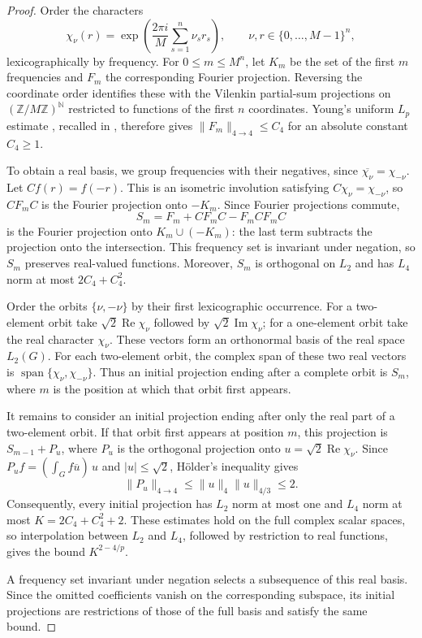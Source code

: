 \documentclass[11pt,a4paper,reqno]{amsart}
\theoremstyle{definition}
\newcommand{\N}{\mathbb N}
\newcommand{\norm}[1]{\lVert #1\rVert}
\numberwithin{equation}{section}
\begin{document}
\begin{proof}
Order the characters
\begin{equation*}
 \chi_\nu(r)=\exp\left(\frac{2\pi i}{M}
                  \sum_{s=1}^n\nu_sr_s\right),
 \qquad \nu,r\in\{0,\ldots,M-1\}^n,
\end{equation*}
lexicographically by frequency. For $0\leq m\leq M^n$, let $K_m$ be the set of the first $m$ frequencies and $F_m$ the corresponding Fourier projection. Reversing the coordinate order identifies these with the Vilenkin partial-sum projections on $(\mathbb Z/M\mathbb Z)^{\N}$ restricted to functions of the first $n$ coordinates. Young's uniform $L_p$ estimate \cite{Young1976}, recalled in \cite[(1.2)]{Young1991}, therefore gives $\norm{F_m}_{4\to4}\leq C_4$ for an absolute constant $C_4\geq1$.

To obtain a real basis, we group frequencies with their negatives, since $\overline{\chi_\nu}=\chi_{-\nu}$. Let $Cf(r)=f(-r)$. This is an isometric involution satisfying $C\chi_\nu=\chi_{-\nu}$, so $CF_mC$ is the Fourier projection onto $-K_m$. Since Fourier projections commute,
\begin{equation*}
 S_m=F_m+CF_mC-F_mCF_mC
\end{equation*}
is the Fourier projection onto $K_m\cup(-K_m)$: the last term subtracts the projection onto the intersection. This frequency set is invariant under negation, so $S_m$ preserves real-valued functions. Moreover, $S_m$ is orthogonal on $L_2$ and has $L_4$ norm at most $2C_4+C_4^2$.

Order the orbits $\{\nu,-\nu\}$ by their first lexicographic occurrence. For a two-element orbit take $\sqrt2\operatorname{Re}\chi_\nu$ followed by $\sqrt2\operatorname{Im}\chi_\nu$; for a one-element orbit take the real character $\chi_\nu$. These vectors form an orthonormal basis of the real space $L_2(G)$. For each two-element orbit, the complex span of these two real vectors is $\operatorname{span}\{\chi_\nu,\chi_{-\nu}\}$. Thus an initial projection ending after a complete orbit is $S_m$, where $m$ is the position at which that orbit first appears.

It remains to consider an initial projection ending after only the real part of a two-element orbit. If that orbit first appears at position $m$, this projection is $S_{m-1}+P_u$, where $P_u$ is the orthogonal projection onto $u=\sqrt2\operatorname{Re}\chi_\nu$. Since $P_uf=(\int_G f\overline u)\,u$ and $|u|\leq\sqrt2$, H\"older's inequality gives
\begin{equation*}
 \norm{P_u}_{4\to4}\leq\norm u_4\norm u_{4/3}\leq2.
\end{equation*}
Consequently, every initial projection has $L_2$ norm at most one and $L_4$ norm at most $K=2C_4+C_4^2+2$. These estimates hold on the full complex scalar spaces, so interpolation between $L_2$ and $L_4$, followed by restriction to real functions, gives the bound $K^{2-4/p}$.

A frequency set invariant under negation selects a subsequence of this real basis. Since the omitted coefficients vanish on the corresponding subspace, its initial projections are restrictions of those of the full basis and satisfy the same bound.
\end{proof}
\end{document}
